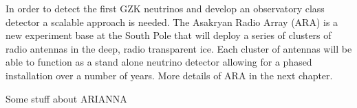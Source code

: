 In order to detect the first GZK neutrinos and develop an observatory class detector a scalable approach is needed. The Asakryan Radio Array (ARA) is a new experiment base at the South Pole that will deploy a series of clusters of radio antennas in the deep, radio transparent ice. Each cluster of antennas will be able to function as a stand alone neutrino detector allowing for a phased installation over a number of years. More details of ARA in the next chapter.

Some stuff about ARIANNA

















%
%
%
%
